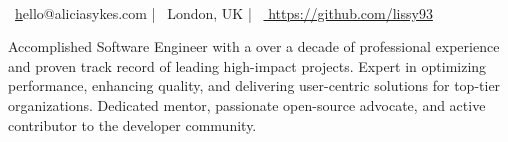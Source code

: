 \documentclass[]{resume-format}
\begin{document}
%


\setlength\fboxsep{10pt}%

\begingroup

\noindent
\colorbox{headerbg}{
  \parbox{\dimexpr\textwidth-2\fboxsep}{
    \color{white} %
    \begin{center} %
      \\[2mm] %
      \faEnvelope~\href{mailto:hello@aliciasykes.com}hello@aliciasykes.com %
      \quad|\quad %
      \faMapMarker~London, UK %
      \quad|\quad %
      \faLink~\href{ https://github.com/lissy93 }{ https://github.com/lissy93 } %
    \end{center} %
  }
}
\endgroup
\vspace{2mm} %



\begin{cvpersonalstatement}
  \item { Accomplished Software Engineer with a over a decade of professional experience and proven track record of leading high-impact projects. Expert in optimizing performance, enhancing quality, and delivering user-centric solutions for top-tier organizations. Dedicated mentor, passionate open-source advocate, and active contributor to the developer community. }
\end{cvpersonalstatement}


\end{document}
